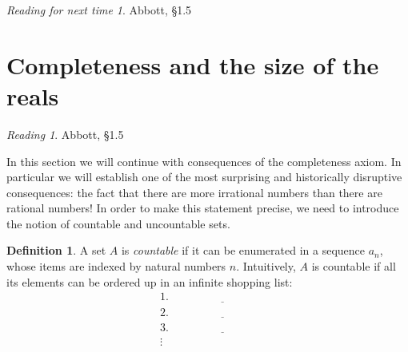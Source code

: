 \documentclass[11pt,oneside]{amsbook}
\newcommand{\set}[1]{\left\{\,#1\,\right\}}
\newcommand{\N}{\mathbb N}
\theoremstyle{definition}
\newtheorem{exerc}{Exercise}[section]
\theoremstyle{plain}
\theoremstyle{definition}
\newtheorem{definition}[theorem]{Definition}
\theoremstyle{remark}
\newtheorem*{reading}{Reading}
\newtheorem*{readnext}{Reading for next time}
\numberwithin{equation}{section}
\numberwithin{figure}{section}
\begin{document}
%
%

\vspace{\fill}
\begin{readnext}
  Abbott, \S 1.5
\end{readnext}

\newpage
\section{Completeness and the size of the reals}

\begin{reading}
  Abbott, \S 1.5
\end{reading}

In this section we will continue with consequences of the completeness axiom. In particular we will establish one of the most surprising and historically disruptive consequences: the fact that there are more irrational numbers than there are rational numbers! In order to make this statement precise, we need to introduce the notion of countable and uncountable sets.

\begin{definition}
  A set $A$ is \emph{countable} if it can be enumerated in a sequence $a_n$, whose items are indexed by natural numbers $n$. Intuitively, $A$ is countable if all its elements can be ordered up in an infinite shopping list:
  \begin{align*}
    1.&\quad\underline{\hspace{1in}}\\
    2.&\quad\underline{\hspace{1in}}\\
    3.&\quad\underline{\hspace{1in}}\\
    \vdots&
  \end{align*}
\end{definition}
\end{document}
